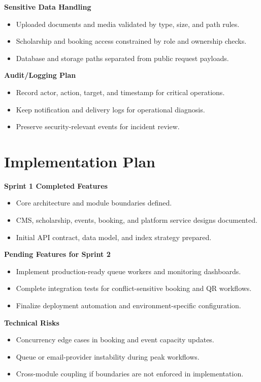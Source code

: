 \documentclass[12pt,a4paper]{article}
\begin{document}
\textbf{Sensitive Data Handling}
\begin{itemize}[nosep]
\item Uploaded documents and media validated by type, size, and path rules.
\item Scholarship and booking access constrained by role and ownership checks.
\item Database and storage paths separated from public request payloads.
\end{itemize}

\textbf{Audit/Logging Plan}
\begin{itemize}[nosep]
\item Record actor, action, target, and timestamp for critical operations.
\item Keep notification and delivery logs for operational diagnosis.
\item Preserve security-relevant events for incident review.
\end{itemize}

\section{Implementation Plan}

\textbf{Sprint 1 Completed Features}
\begin{itemize}[nosep]
\item Core architecture and module boundaries defined.
\item CMS, scholarship, events, booking, and platform service designs documented.
\item Initial API contract, data model, and index strategy prepared.
\end{itemize}

\textbf{Pending Features for Sprint 2}
\begin{itemize}[nosep]
\item Implement production-ready queue workers and monitoring dashboards.
\item Complete integration tests for conflict-sensitive booking and QR workflows.
\item Finalize deployment automation and environment-specific configuration.
\end{itemize}

\textbf{Technical Risks}
\begin{itemize}[nosep]
\item Concurrency edge cases in booking and event capacity updates.
\item Queue or email-provider instability during peak workflows.
\item Cross-module coupling if boundaries are not enforced in implementation.
\end{itemize}
\end{document}

